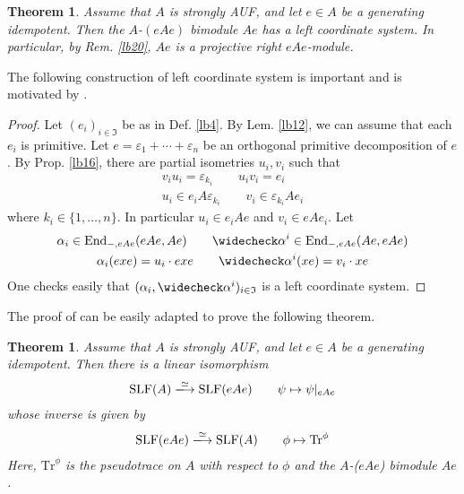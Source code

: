\documentclass[11pt,b5paper,notitlepage]{article}
\theoremstyle{definition}
\theoremstyle{plain}
\newtheorem{thm}[df]{Theorem}
\newcommand{\fk}{\mathfrak}
\newcommand{\wch}{\widecheck}
\newcommand{\Tr}{\mathrm{Tr}}
\newcommand{\End}{\mathrm{End}} %
\newcommand{\eps}{\varepsilon}
\newcommand{\SLF}{\mathrm{SLF}}
\numberwithin{equation}{section}
\begin{document}
\begin{thm}\label{lb17}
Assume that $A$ is strongly AUF, and let $e\in A$ be a generating idempotent. Then the $A$-$(eAe)$ bimodule $Ae$ has a left coordinate system. In particular, by Rem. \ref{lb20}, $Ae$ is a projective right $eAe$-module.
\end{thm}

The following construction of left coordinate system is important and is motivated by \cite[Lem. 3.9]{Ari10}.


\begin{proof}
Let $(e_i)_{i\in\fk I}$ be as in Def. \ref{lb4}. By Lem. \ref{lb12}, we can assume that each $e_i$ is primitive. Let $e=\eps_1+\cdots+\eps_n$ be an orthogonal primitive decomposition of $e$. By Prop. \ref{lb16}, there are partial isometries $u_i,v_i$ such that
\begin{gather*}
v_iu_i=\eps_{k_i}\qquad u_iv_i=e_i\\
u_i\in e_iA\eps_{k_i}\qquad v_i\in \eps_{k_i}Ae_i
\end{gather*} 
where $k_i\in\{1,\dots,n\}$. In particular $u_i\in e_iAe$ and $v_i\in eAe_i$. Let
\begin{gather*}
\alpha_i\in\End_{-,eAe}(eAe,Ae)\qquad \wch\alpha^i\in\End_{-,eAe}(Ae,eAe) \\
\alpha_i(exe)=u_i\cdot exe\qquad \wch\alpha^i(xe)=v_i\cdot xe 
\end{gather*}
One checks easily that $(\alpha_i,\wch\alpha^i)_{i\in\fk I}$ is a left coordinate system.
\end{proof}


The proof of \cite[Thm. 3.10]{Ari10} can be easily adapted to prove the following theorem.

\begin{thm}\label{lb42}
Assume that $A$ is strongly AUF, and let $e\in A$ be a generating idempotent. Then there is a linear isomorphism
\begin{align*}
\SLF(A)\xlongrightarrow{\simeq} \SLF(eAe)\qquad \psi\mapsto \psi|_{eAe}
\end{align*}
whose inverse is given by
\begin{align*}
\SLF(eAe)\xlongrightarrow{\simeq}\SLF(A)\qquad \phi\mapsto \Tr^\phi
\end{align*}
Here, $\Tr^\phi$ is the pseudotrace on $A$ with respect to $\phi$ and the $A$-($eAe$) bimodule $Ae$.
\end{thm}
\end{document}
